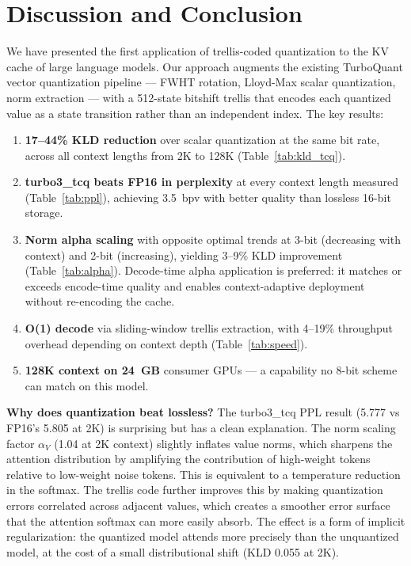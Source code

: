 \documentclass{article}
\begin{document}
\section{Discussion and Conclusion}
\label{sec:discussion}

We have presented the first application of trellis-coded quantization to the KV
cache of large language models. Our approach augments the existing TurboQuant
vector quantization pipeline --- FWHT rotation, Lloyd-Max scalar quantization,
norm extraction --- with a 512-state bitshift trellis that encodes each quantized
value as a state transition rather than an independent index. The key results:

\begin{enumerate}\setlength{\itemsep}{2pt}
\item \textbf{17--44\% KLD reduction} over scalar quantization at the same bit
rate, across all context lengths from 2K to 128K (Table~\ref{tab:kld_tcq}).
\item \textbf{turbo3\_tcq beats FP16 in perplexity} at every context length
measured (Table~\ref{tab:ppl}), achieving 3.5~bpv with better quality than
lossless 16-bit storage.
\item \textbf{Norm alpha scaling} with opposite optimal trends at 3-bit
(decreasing with context) and 2-bit (increasing), yielding 3--9\% KLD
improvement (Table~\ref{tab:alpha}). Decode-time alpha application is
preferred: it matches or exceeds encode-time quality and enables
context-adaptive deployment without re-encoding the cache.
\item \textbf{O(1) decode} via sliding-window trellis extraction, with 4--19\%
throughput overhead depending on context depth (Table~\ref{tab:speed}).
\item \textbf{128K context on 24~GB} consumer GPUs --- a capability no 8-bit
scheme can match on this model.
\end{enumerate}

\textbf{Why does quantization beat lossless?} The turbo3\_tcq PPL result (5.777
vs FP16's 5.805 at 2K) is surprising but has a clean explanation. The norm
scaling factor $\alpha_V$ (1.04 at 2K context) slightly inflates value norms, which sharpens
the attention distribution by amplifying the contribution of high-weight tokens
relative to low-weight noise tokens. This is equivalent to a temperature
reduction in the softmax. The trellis code further improves this by making
quantization errors correlated across adjacent values, which creates a smoother
error surface that the attention softmax can more easily absorb. The effect is
a form of implicit regularization: the quantized model attends more precisely
than the unquantized model, at the cost of a small distributional shift (KLD
0.055 at 2K).
\end{document}
